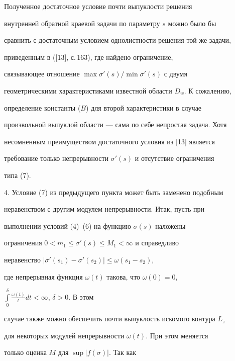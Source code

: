 Полученное достаточное условие почти выпуклости решения


внутренней обратной краевой задачи по параметру $s$ можно было бы


сравнить с достаточным условием однолистности решения той же задачи,


приведенным в ([13], с.\,163), где найдено ограничение,


связывающее отношение $\max \sigma'(s)/\min \sigma'(s)$ с двумя


геометрическими характеристиками известной области $D_w$. К сожалению,


определение константы ($B$) для второй характеристики в случае


произвольной выпуклой области --- сама по себе непростая задача. Хотя


несомненным преимуществом достаточного условия из [13] является


требование только непрерывности $\sigma'(s)$ и отсутствие ограничения


типа (7). 





4. Условие (7) из предыдущего пункта может быть заменено подобным


неравенством с другим модулем непрерывности. Итак, пусть при


выполнении условий (4)--(6) на функцию $\sigma(s)$ наложены


ограничения $0 < m_1 \leq \sigma'(s) \leq M_1 < \infty$ и справедливо


неравенство $|\sigma'(s_1) - \sigma'(s_2)| \leq \omega (s_1 - s_2)$,


где непрерывная функция $\omega(t)$ такова, что $\omega(0) = 0$,


$\int\limits_0^{\delta} \frac{\omega(t)}{t} dt < \infty$, $\delta>0$. В этом


случае также можно обеспечить почти выпуклость искомого контура $L_z$


для некоторых модулей непрерывности $\omega(t)$. При этом меняется


только оценка $M$ для $\sup |f(\sigma)|$. Так как


